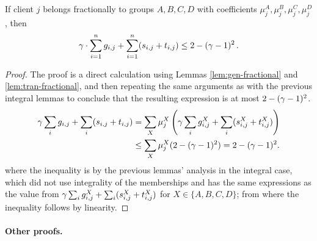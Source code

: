\begin{lemma}
    \label{lem:budget-fractional}
    If client $j$ belongs fractionally to groups $A,B,C,D$ with coefficients $\mu_j^A, \mu_j^B, \mu_j^C, \mu_j^D$, then
    \begin{equation*}
        \gamma \cdot \sum_{i=1}^n g_{i,j} + \sum_{i=1}^n (s_{i,j} + t_{i,j}) \leq 2-(\gamma-1)^2\,.
    \end{equation*}
\end{lemma}
\begin{proof}
    The proof is a direct calculation using Lemmas \ref{lem:gen-fractional} and \ref{lem:tran-fractional}, and then repeating the same arguments as with the previous integral lemmas to conclude that the resulting expression is at most $2-(\gamma-1)^2$.
    \begin{align*}
        \gamma \sum_i g_{i,j} + \sum_i(s_{i,j}+t_{i,j})
        &= \sum_X \mu_j^X \left(\gamma \sum_i g_{i,j}^X + \sum_i(s_{i,j}^X+t_{i,j}^X)\right) \\
        &\le \sum_X \mu_j^X (2-(\gamma-1)^2)
        = 2-(\gamma-1)^2.
    \end{align*}
    where the inequality is by the previous lemmas' analysis in the integral case, which did not use integrality of the memberships and has the same expressions as the value from $\gamma \sum_i g_{i,j}^X + \sum_i(s_{i,j}^X+t_{i,j}^X)$ for $X \in \{A,B,C,D\}$; from where the inequality follows by linearity.
\end{proof}

\paragraph{Other proofs.}

